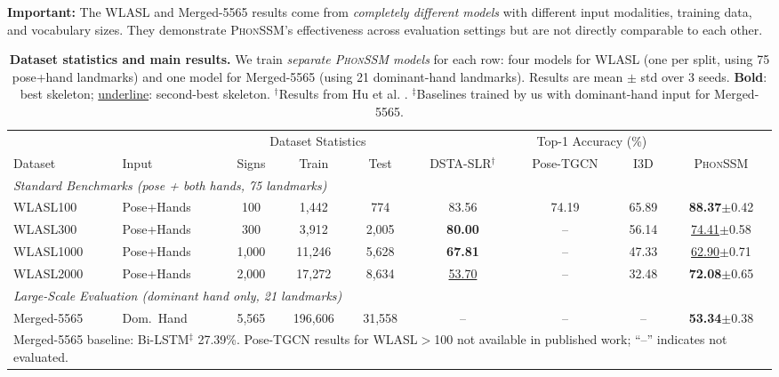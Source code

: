 \documentclass[sigconf,nonacm,anonymous]{acmart}
\theoremstyle{definition}
\theoremstyle{remark}
\newcommand{\phonssm}{\textsc{PhonSSM}}
\begin{document}
\textbf{Important:} The WLASL and Merged-5565 results come from \textit{completely different models} with different input modalities, training data, and vocabulary sizes. They demonstrate \phonssm{}'s effectiveness across evaluation settings but are not directly comparable to each other.

\begin{table}[!htb]
\caption{\textbf{Dataset statistics and main results.} We train \textit{separate \phonssm{} models} for each row: four models for WLASL (one per split, using 75 pose+hand landmarks) and one model for Merged-5565 (using 21 dominant-hand landmarks). Results are mean $\pm$ std over 3 seeds. \textbf{Bold}: best skeleton; \uline{underline}: second-best skeleton. $^\dagger$Results from Hu et al. \cite{hu2024dsta}. $^\ddagger$Baselines trained by us with dominant-hand input for Merged-5565.}
\label{tab:datasets}
\begin{center}
\small
\begin{tabular}{llccccccc}
\toprule
& & \multicolumn{3}{c}{Dataset Statistics} & \multicolumn{4}{c}{Top-1 Accuracy (\%)} \\
\cmidrule(lr){3-5} \cmidrule(lr){6-9}
Dataset & Input & Signs & Train & Test & DSTA-SLR$^\dagger$ & Pose-TGCN & I3D & \phonssm{} \\
\midrule
\multicolumn{9}{l}{\textit{Standard Benchmarks (pose + both hands, 75 landmarks)}} \\
WLASL100 & Pose+Hands & 100 & 1,442 & 774 & 83.56 & 74.19 & 65.89 & \textbf{88.37}{\scriptsize $\pm$0.42} \\
WLASL300 & Pose+Hands & 300 & 3,912 & 2,005 & \textbf{80.00} & -- & 56.14 & \uline{74.41}{\scriptsize $\pm$0.58} \\
WLASL1000 & Pose+Hands & 1,000 & 11,246 & 5,628 & \textbf{67.81} & -- & 47.33 & \uline{62.90}{\scriptsize $\pm$0.71} \\
WLASL2000 & Pose+Hands & 2,000 & 17,272 & 8,634 & \uline{53.70} & -- & 32.48 & \textbf{72.08}{\scriptsize $\pm$0.65} \\
\midrule
\multicolumn{9}{l}{\textit{Large-Scale Evaluation (dominant hand only, 21 landmarks)}} \\
Merged-5565 & Dom.\ Hand & 5,565 & 196,606 & 31,558 & -- & -- & -- & \textbf{53.34}{\scriptsize $\pm$0.38} \\
\bottomrule
\multicolumn{9}{l}{\footnotesize Merged-5565 baseline: Bi-LSTM$^\ddagger$ 27.39\%. Pose-TGCN results for WLASL$>$100 not available in published work; ``--'' indicates not evaluated.}
\end{tabular}
\end{center}
\end{table}
\end{document}
